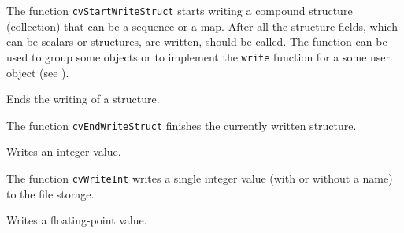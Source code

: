 The function \texttt{cvStartWriteStruct} starts writing a compound
structure (collection) that can be a sequence or a map. After all
the structure fields, which can be scalars or structures, are
written,  should be called. The function can
be used to group some objects or to implement the \texttt{write}
function for a some user object (see ).

\label{EndWriteStruct}

Ends the writing of a structure.


\begin{description}
\end{description}


The function \texttt{cvEndWriteStruct} finishes the currently written structure.

\label{WriteInt}

Writes an integer value.


\begin{description}
\end{description}

The function \texttt{cvWriteInt} writes a single integer value (with or without a name) to the file storage.

\label{WriteReal}

Writes a floating-point value.


\begin{description}
\end{description}

